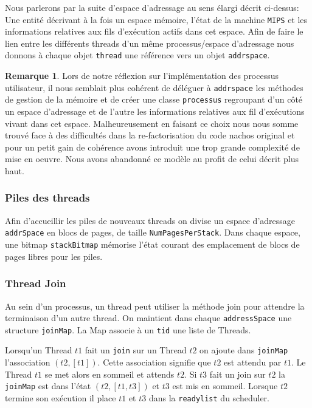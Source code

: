\documentclass[11pt]{article}
\theoremstyle{definition}
\newtheorem*{myRem}{Remarque}
\begin{document}
Nous parlerons par la suite d'espace d'adressage au sens élargi décrit ci-dessus:
Une entité décrivant à la fois un espace mémoire, l'état de la machine \texttt{MIPS} et les informations relatives aux fils d'exécution actifs dans cet espace. Afin de faire le lien entre les différents threads d'un même processus/espace d'adressage nous donnons à chaque objet \texttt{thread} une référence vers un objet \texttt{addrspace}.

\begin{myRem}
Lors de notre réflexion sur l'implémentation des processus utilisateur, il nous semblait plus cohérent de déléguer à \texttt{addrspace} les méthodes de gestion de la mémoire et de créer une classe \texttt{processus} regroupant d'un côté un espace d'adressage et de l'autre les informations relatives aux fil d'exécutions vivant dans cet espace. Malheureusement en faisant ce choix nous nous somme trouvé face à des difficultés dans la re-factorisation du code nachos original et pour un petit gain de cohérence avons introduit une trop grande complexité de mise en oeuvre. Nous avons abandonné ce modèle au profit de celui décrit plus haut.
\end{myRem}

\subsubsection{Piles des threads}
Afin d'accueillir les piles de nouveaux threads on divise un espace d'adressage \texttt{addrSpace} en blocs de pages, de taille \texttt{NumPagesPerStack}.
Dans chaque espace, une bitmap \texttt{stackBitmap} mémorise l'état courant des emplacement de blocs de pages libres pour les piles. 

\subsubsection{Thread Join}
Au sein d'un processus, un thread peut utiliser la méthode join pour attendre la terminaison d'un autre thread.
On maintient dans chaque \texttt{addressSpace} une structure \texttt{joinMap}.
La Map associe à un \texttt{tid} une liste de Threads.

Lorsqu'un Thread $t1$ fait un \texttt{join} sur un Thread $t2$ on ajoute dans \texttt{joinMap}
l'association $(t2, [t1])$. Cette association signifie que $t2$ est attendu par $t1$.
Le Thread $t1$ se met alors en sommeil et attends $t2$. 
Si $t3$ fait un join sur $t2$ la \texttt{joinMap} est dans l'état $(t2, [t1,t3])$ et $t3$ est mis en sommeil.
Lorsque $t2$ termine son exécution il place $t1$ et $t3$ dans la \texttt{readylist} du scheduler.
\end{document}
